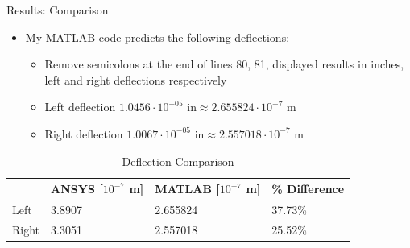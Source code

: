 \documentclass[11pt]{beamer}
\begin{document}
    \begin{frame}{Results: Comparison}
        \begin{itemize}
            \item My \href{https://github.com/A-Person7/a_design_class/blob/main/hw7/problem3.m}{MATLAB code} predicts the following deflections:
            \begin{itemize} 
                \item Remove semicolons at the end of lines 80, 81, displayed results in inches, left and right deflections respectively
                \item Left deflection $1.0456\cdot10^{-05} \textrm{ in} \approx 2.655824\cdot10^{-7} \textrm{ m}$
                \item Right deflection $1.0067\cdot10^{-05} \textrm{ in} \approx 2.557018\cdot10^{-7} \textrm{ m}$
            \end{itemize}
        \end{itemize}

        \begin{table}[!ht]
            \centering
            \begin{tabular}{|l|l|l|l|}
            \hline
                ~ & ANSYS [$10^{-7}$ m] & MATLAB [$10^{-7}$ m] & \% Difference \\ \hline
                Left & 3.8907 & 2.655824 & 37.73\% \\ \hline
                Right & 3.3051 & 2.557018 & 25.52\% \\ \hline
            \end{tabular}
            \caption{Deflection Comparison}
        \end{table}
    \end{frame}
\end{document}

